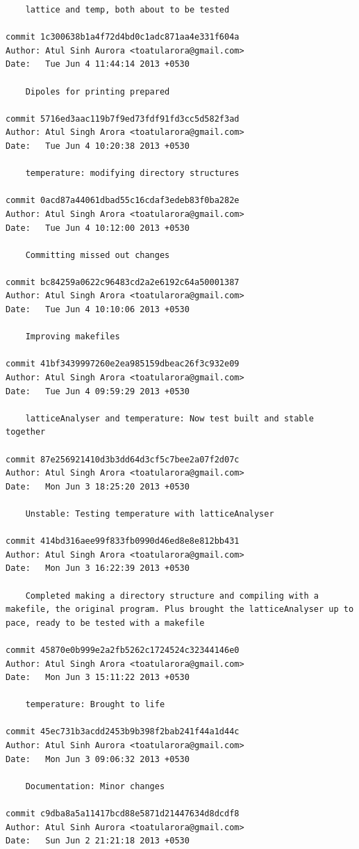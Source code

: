 \begin{lstlisting}
    lattice and temp, both about to be tested

commit 1c300638b1a4f72d4bd0c1adc871aa4e331f604a
Author: Atul Sinh Aurora <toatularora@gmail.com>
Date:   Tue Jun 4 11:44:14 2013 +0530

    Dipoles for printing prepared

commit 5716ed3aac119b7f9ed73fdf91fd3cc5d582f3ad
Author: Atul Singh Arora <toatularora@gmail.com>
Date:   Tue Jun 4 10:20:38 2013 +0530

    temperature: modifying directory structures

commit 0acd87a44061dbad55c16cdaf3edeb83f0ba282e
Author: Atul Singh Arora <toatularora@gmail.com>
Date:   Tue Jun 4 10:12:00 2013 +0530

    Committing missed out changes

commit bc84259a0622c96483cd2a2e6192c64a50001387
Author: Atul Singh Arora <toatularora@gmail.com>
Date:   Tue Jun 4 10:10:06 2013 +0530

    Improving makefiles

commit 41bf3439997260e2ea985159dbeac26f3c932e09
Author: Atul Singh Arora <toatularora@gmail.com>
Date:   Tue Jun 4 09:59:29 2013 +0530

    latticeAnalyser and temperature: Now test built and stable together

commit 87e256921410d3b3dd64d3cf5c7bee2a07f2d07c
Author: Atul Singh Arora <toatularora@gmail.com>
Date:   Mon Jun 3 18:25:20 2013 +0530

    Unstable: Testing temperature with latticeAnalyser

commit 414bd316aee99f833fb0990d46ed8e8e812bb431
Author: Atul Singh Arora <toatularora@gmail.com>
Date:   Mon Jun 3 16:22:39 2013 +0530

    Completed making a directory structure and compiling with a makefile, the original program. Plus brought the latticeAnalyser up to pace, ready to be tested with a makefile

commit 45870e0b999e2a2fb5262c1724524c32344146e0
Author: Atul Singh Arora <toatularora@gmail.com>
Date:   Mon Jun 3 15:11:22 2013 +0530

    temperature: Brought to life

commit 45ec731b3acdd2453b9b398f2bab241f44a1d44c
Author: Atul Sinh Aurora <toatularora@gmail.com>
Date:   Mon Jun 3 09:06:32 2013 +0530

    Documentation: Minor changes

commit c9dba8a5a11417bcd88e5871d21447634d8dcdf8
Author: Atul Sinh Aurora <toatularora@gmail.com>
Date:   Sun Jun 2 21:21:18 2013 +0530


\end{lstlisting}
